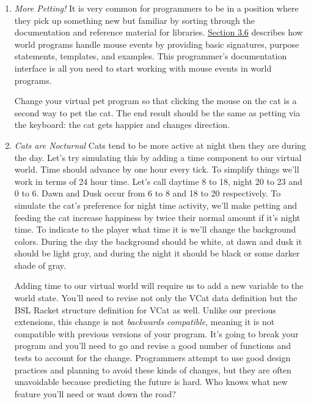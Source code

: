 \documentclass[nobib]{tufte-handout}
\begin{document}
\begin{enumerate}[resume]
  \item \textit{More Petting!}
  \newline
  It is very common for programmers to be in a position where they pick up something new but familiar by sorting through the documentation and reference material for libraries. \href{http://www.htdp.org/2018-01-06/Book/part_one.html#%28part._.D.K._sec~3adesign-world%29}{Section 3.6} describes how world programs handle mouse events by providing basic signatures, purpose statements, templates, and examples. This programmer's documentation interface is all you need to start working with mouse events in world programs.

  Change your virtual pet program so that clicking the mouse on the cat is a second way to pet the cat. The end result should be the same as petting via the keyboard: the cat gets happier and changes direction.

  \item \textit{Cats are Nocturnal}
  \newline
  Cats tend to be more active at night then they are during the day. Let's try simulating this by adding a time component to our virtual world. Time should advance by one hour every tick. To simplify things we'll work in terms of 24 hour time. Let's call daytime 8 to 18, night 20 to 23 and 0 to 6.  Dawn and Dusk occur from 6 to 8 and 18 to 20 respectively. To simulate the cat's preference for night time activity, we'll make petting and feeding the cat increase happiness by twice their normal amount if it's night time. To indicate to the player what time it is we'll change the background colors.  During the day the background should be white, at dawn and dusk it should be light gray, and during the night it should be black or some darker shade of gray.

  Adding time to our virtual world will require us to add a new variable to the world state. You'll need to revise not only the VCat data definition but the BSL Racket structure definition for VCat as well. Unlike our previous extensions, this change is not \textit{backwards compatible}, meaning it is not compatible with previous versions of your program. It's going to break your program and you'll need to go and revise a good number of functions and tests to account for the change. Programmers attempt to use good design practices and planning to avoid these kinds of changes, but they are often unavoidable because predicting the future is hard. Who knows what new feature you'll need or want down the road?

  \end{enumerate}
\end{document}
